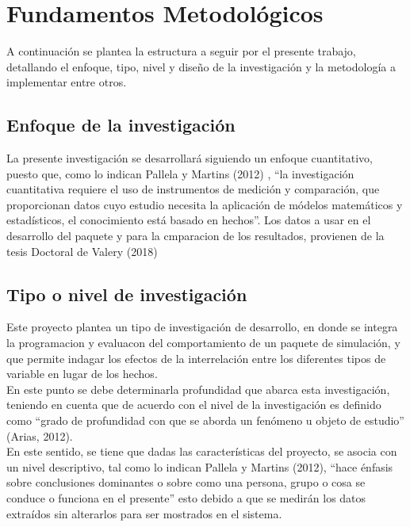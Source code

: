 \chapter{Fundamentos Metodol\'ogicos}

	A continuaci\'on se plantea la estructura a seguir por el presente trabajo, detallando el enfoque, tipo, nivel y dise\~no de la investigaci\'on y la metodolog\'ia a implementar entre otros.
	
\section{Enfoque de la investigaci\'on}
	
	La presente investigaci\'on se desarrollar\'a siguiendo un enfoque cuantitativo, puesto que, como lo indican Pallela y  Martins (2012) , “la investigaci\'on cuantitativa requiere el uso de instrumentos de medici\'on y comparaci\'on, que proporcionan datos cuyo estudio necesita la aplicaci\'on de m\'odelos matem\'aticos y estad\'isticos, el conocimiento est\'a basado en hechos”.  Los datos a usar en el desarrollo del paquete y para la cmparacion de los resultados, provienen de la tesis Doctoral de Valery (2018)\\
	
\section{Tipo o nivel de investigaci\'on}
	
	Este proyecto plantea un tipo de investigaci\'on de desarrollo, en donde se integra la programacion y evaluacon del comportamiento de un paquete de simulación, y que permite indagar los efectos de la interrelaci\'on entre los diferentes tipos de variable en lugar de los hechos.\\

	En este punto se debe determinarla profundidad que abarca esta investigaci\'on, teniendo en cuenta que de acuerdo con  el nivel de la investigaci\'on es definido como “grado de profundidad con que se aborda un fen\'omeno u objeto de estudio” (Arias, 2012).\\

	En este sentido, se tiene que dadas las caracter\'isticas del proyecto, se asocia con un nivel descriptivo, tal como lo indican Pallela y  Martins (2012),  “hace \'enfasis sobre conclusiones dominantes o sobre como una persona, grupo o cosa se conduce o funciona en el presente” esto debido a que se medir\'an los datos extra\'idos sin alterarlos para ser mostrados en el sistema.\\

